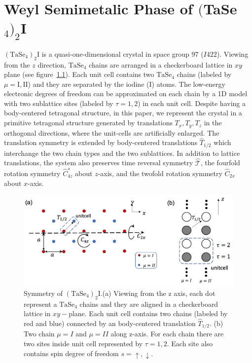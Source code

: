 \chapter{Weyl Semimetalic Phase of $($TaSe$_4)_2$I}

$(\mathrm{TaSe}_4)_2\mathrm{I}$ is a quasi-one-dimensional crystal in space group 97 ($I422$). Viewing from the $z$ direction, $\mathrm{TaSe}_4$ chains are arranged in a checkerboard lattice in $xy$ plane (see figure~\ref{fig:tasesymmetry}). Each unit cell contains two $\mathrm{TaSe}_4$ chains (labeled by $\mu=\mathrm{I},\mathrm{II}$) and they are separated by the iodine (I) atoms. The low-energy electronic degrees of freedom can be approximated on each chain by a 1D model with two sublattice sites (labeled by $\tau=1,2$) in each unit cell. Despite having a body-centered tetragonal structure, in this paper, we represent the crystal in a primitive tetragonal structure generated by translations $T_x,T_y,T_z$ in the orthogonal directions, where the unit-cells are artificially enlarged. The translation symmetry is extended by body-centered translations $\hat{T}_{1/2}$ which interchange the two chain types and the two sublattices. In addition to lattice translations, the system also preserves time reversal symmetry $\hat{\mathcal{T}}$, the fourfold rotation symmetry $\hat{C}_{4z}^s$ about $z$-axis, and the twofold rotation symmetry $\hat{C}_{2x}$ about $x$-axis. 
 \begin{figure}
     \centering
     \includegraphics[width =\textwidth]{images/tasesymmetry.png}
     \caption{Symmetry of $(\mathrm{TaSe}_4)_2\mathrm{I}$.(a) Viewing from the z axis, each dot represent a  $\mathrm{TaSe}_4$ chains and they are aligned in a checkerboard lattice in $xy-$plane. Each unit cell contains two chains (labeled by red  and blue) connected by an body-centered translation $\hat{T}_{1/2}$. (b) Two chain $\mu=I$ and $\mu=II$ along z-axis. For each chain there are two sites inside unit cell represented by $\tau=1,2$. Each site also contains spin degree of freedom $s=\uparrow, \downarrow$.}
     \label{fig:tasesymmetry}
 \end{figure}



